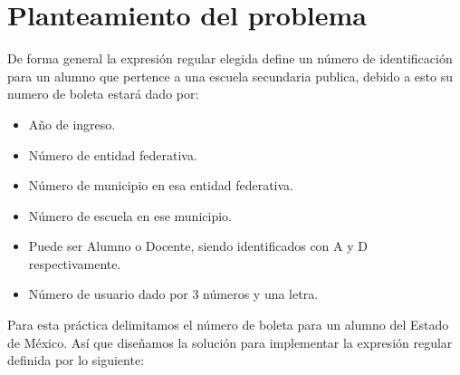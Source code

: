 \documentclass[12pt]{article}
\begin{document}

	\section{Planteamiento del problema}
	De forma general la expresión regular elegida define un número de identificación para un alumno que 
	pertence a una escuela secundaria publica, debido a esto su numero de boleta estará dado por:
	\begin{itemize}
		\item Año de ingreso.										
		\item Número de entidad federativa. 						
		\item Número de municipio en esa entidad federativa.		
		\item Número de escuela en ese municipio.					
		\item Puede ser Alumno o Docente, siendo identificados con A y D respectivamente.	
		\item Número de usuario dado por 3 números y una letra.								
	\end{itemize}
	Para esta práctica delimitamos el número de boleta para un alumno del Estado de México.
	Así que diseñamos la solución para implementar la expresión regular definida por lo siguiente:
\end{document}
